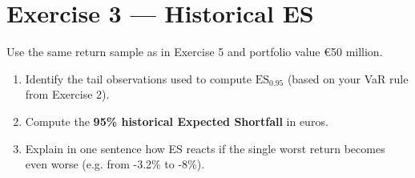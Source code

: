 \documentclass[11pt]{article}
\newcommand{\ES}{\mathrm{ES}}
\begin{document}
\section*{Exercise 3 — Historical ES}
Use the same return sample as in Exercise 5 and portfolio value €50 million.

\begin{enumerate}
  \item Identify the tail observations used to compute $\ES_{0.95}$ (based on your VaR rule from Exercise 2).
  \item Compute the \textbf{95\% historical Expected Shortfall} in euros.
  \item Explain in one sentence how ES reacts if the single worst return becomes even worse (e.g. from -3.2\% to -8\%).
\end{enumerate}
\end{document}
